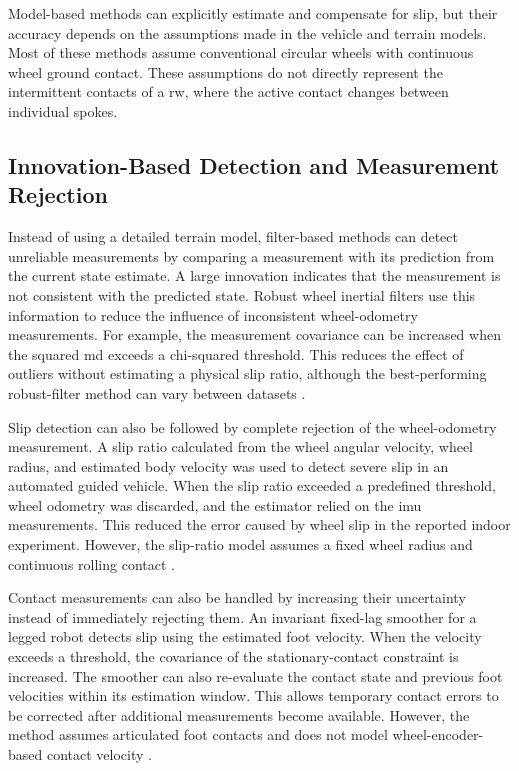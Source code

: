 \documentclass[report.tex]{subfiles}
\begin{document}
    Model-based methods can explicitly estimate and compensate for slip, but their accuracy depends on the assumptions made in the vehicle and terrain models. Most of these methods assume conventional circular wheels with continuous wheel ground contact. These assumptions do not directly represent the intermittent contacts of a \gls{rw}, where the active contact changes between individual spokes.

    \subsection{Innovation-Based Detection and Measurement Rejection}
    \label{subsec:sota_innovation_slip}

    Instead of using a detailed terrain model, filter-based methods can detect unreliable measurements by comparing a measurement with its prediction from the current state estimate. A large innovation indicates that the measurement is not consistent with the predicted state. Robust wheel inertial filters use this information to reduce the influence of inconsistent wheel-odometry measurements. For example, the measurement covariance can be increased when the squared \gls{md} exceeds a chi-squared threshold. This reduces the effect of outliers without estimating a physical slip ratio, although the best-performing robust-filter method can vary between datasets \cite{Das2021}.

    Slip detection can also be followed by complete rejection of the wheel-odometry measurement. A slip ratio calculated from the wheel angular velocity, wheel radius, and estimated body velocity was used to detect severe slip in an automated guided vehicle. When the slip ratio exceeded a predefined threshold, wheel odometry was discarded, and the estimator relied on the \gls{imu} measurements. This reduced the error caused by wheel slip in the reported indoor experiment. However, the slip-ratio model assumes a fixed wheel radius and continuous rolling contact \cite{Xiaobo2024}.

    Contact measurements can also be handled by increasing their uncertainty instead of immediately rejecting them. An invariant fixed-lag smoother for a legged robot detects slip using the estimated foot velocity. When the velocity exceeds a threshold, the covariance of the stationary-contact constraint is increased. The smoother can also re-evaluate the contact state and previous foot velocities within its estimation window. This allows temporary contact errors to be corrected after additional measurements become available. However, the method assumes articulated foot contacts and does not model wheel-encoder-based contact velocity \cite{Yoon2024}.
\end{document}
